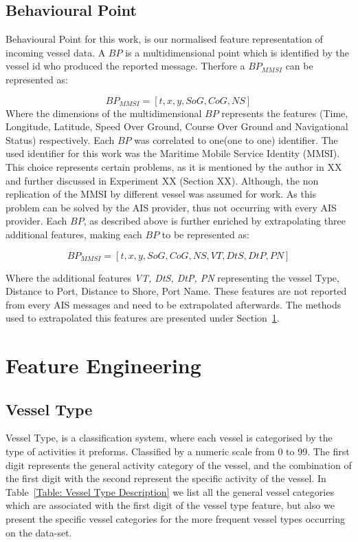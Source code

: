 \subsection{Behavioural Point}
\label{subsection: Behavioural Point}
Behavioural Point for this work, is our normalised feature representation of incoming vessel data. A $BP$ is a multidimensional point which is identified by the vessel id who produced the reported message. Therfore a $BP_{MMSI}$ can be represented as:

\[BP_{MMSI} = [t, x, y, SoG, CoG, NS]\]
Where the dimensions of the multidimensional $BP$ represents the features (Time, Longitude, Latitude, Speed Over Ground, Course Over Ground and Navigational Status) respectively.
Each $BP$ was correlated to one(one to one) identifier. The used identifier for this work was the Maritime Mobile Service Identity (MMSI). This choice represents certain problems, as it is mentioned by the author in XX and further discussed in Experiment XX (Section XX). Although, the non replication of the MMSI by different vessel was assumed for work. As this problem can be solved by the AIS provider, thus not occurring with every AIS provider. 
Each $BP$, as described above is further enriched by extrapolating three additional features, making each $BP$ to be represented as:

\[BP_{MMSI} = [t, x, y, SoG, CoG, NS, VT, DtS, DtP, PN]\]

Where the additional features \emph{VT, DtS, DtP, PN} representing the vessel Type, Distance to Port, Distance to Shore, Port Name. These features are not reported from every AIS messages and need to be extrapolated afterwards. The methods used to extrapolated this features are presented under Section~\ref{section: 4 Feature Engineering}. 

\section{Feature Engineering}
\label{section: 4 Feature Engineering}

\subsection{Vessel Type}
\label{subsection: Vessel Type}
Vessel Type, is a classification system, where each vessel is categorised by the type of activities it preforms. Classified by a numeric scale from 0 to 99. The first digit represents the general activity category of the vessel, and the combination of the first digit with the second represent the specific activity of the vessel. In Table~\ref{Table: Vessel Type Description} we list all the general vessel categories which are associated with the first digit of the vessel type feature, but also we present the specific vessel categories for the more frequent vessel types occurring on the data-set.

